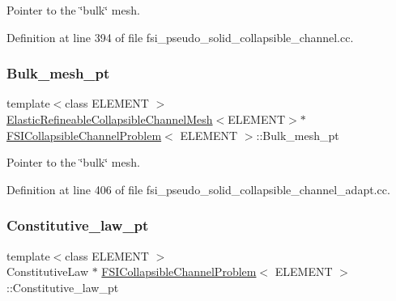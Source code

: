 Pointer to the \char`\"{}bulk\char`\"{} mesh. 



Definition at line 394 of file fsi\+\_\+pseudo\+\_\+solid\+\_\+collapsible\+\_\+channel.\+cc.

\mbox{\label{classFSICollapsibleChannelProblem_ac7c827b880d5499b8c3c4c3c37d6a3c9}} 
\subsubsection{\texorpdfstring{Bulk\+\_\+mesh\+\_\+pt}{Bulk\_mesh\_pt}\hspace{0.1cm}{\footnotesize\ttfamily [6/6]}}
{\footnotesize\ttfamily template$<$class E\+L\+E\+M\+E\+NT $>$ \\
\hyperlink{classElasticRefineableCollapsibleChannelMesh}{Elastic\+Refineable\+Collapsible\+Channel\+Mesh}$<$E\+L\+E\+M\+E\+NT$>$$\ast$ \hyperlink{classFSICollapsibleChannelProblem}{F\+S\+I\+Collapsible\+Channel\+Problem}$<$ E\+L\+E\+M\+E\+NT $>$\+::Bulk\+\_\+mesh\+\_\+pt\hspace{0.3cm}{\ttfamily [private]}}



Pointer to the \char`\"{}bulk\char`\"{} mesh. 



Definition at line 406 of file fsi\+\_\+pseudo\+\_\+solid\+\_\+collapsible\+\_\+channel\+\_\+adapt.\+cc.

\mbox{\label{classFSICollapsibleChannelProblem_a49de3f64c8f375c2709a2d0f5193cef3}} 
\subsubsection{\texorpdfstring{Constitutive\+\_\+law\+\_\+pt}{Constitutive\_law\_pt}}
{\footnotesize\ttfamily template$<$class E\+L\+E\+M\+E\+NT $>$ \\
Constitutive\+Law $\ast$ \hyperlink{classFSICollapsibleChannelProblem}{F\+S\+I\+Collapsible\+Channel\+Problem}$<$ E\+L\+E\+M\+E\+NT $>$\+::Constitutive\+\_\+law\+\_\+pt\hspace{0.3cm}{\ttfamily [private]}}



